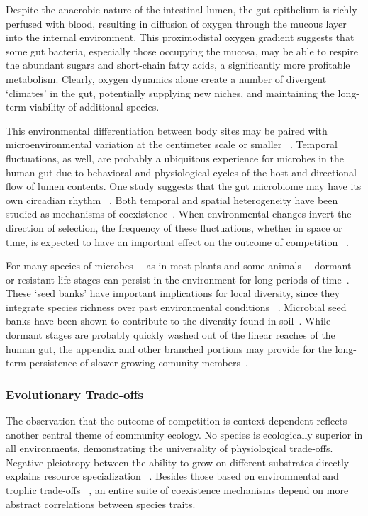 \documentclass[12pt]{article}
\begin{document}
Despite the anaerobic nature of the intestinal lumen,
the gut epithelium is richly perfused with blood, resulting
in diffusion of oxygen through the mucous layer into
the internal environment.
This proximodistal oxygen gradient suggests that some
gut bacteria, especially those occupying the mucosa,
may be able to respire the abundant sugars and short-chain fatty acids,
a significantly more profitable metabolism.
Clearly, oxygen dynamics alone create a number of
divergent `climates' in the gut,
potentially supplying new niches,
and maintaining the long-term viability of additional
species.

This environmental differentiation between body sites may be
paired with microenvironmental variation at the centimeter scale or smaller%
~\citep{Zhang2014}.
Temporal fluctuations, as well, are probably a ubiquitous
experience for microbes in the human gut due to behavioral and physiological
cycles of the host and directional flow of lumen contents.
One study suggests that the gut microbiome may have its own circadian rhythm%
~\citep{Thaiss2014}.
Both temporal and spatial heterogeneity have been studied as
mechanisms of coexistence~\citep{Chesson2000}.
When environmental changes invert the direction of selection,
the frequency of these fluctuations, whether in space or time,
is expected to have an important effect on the outcome of competition%
~\citep{Hutchinson1961}.

For many species of microbes%
---as in most plants and some animals---%
dormant or resistant life-stages can persist in the environment for long
periods of time~\citep{Lennon2011}.
These `seed banks' have important implications for local diversity,
since they integrate species richness over past environmental conditions%
~\citep{Jones2010}.
Microbial seed banks have been shown to contribute to the diversity found in
soil~\citep{Lennon2011}.
While dormant stages are probably quickly washed out of the linear
reaches of the human gut,
the appendix and other branched portions may provide for the long-term
persistence of slower growing comunity members~\citep{Bollinger2007}.

\subsubsection{Evolutionary Trade-offs}
The observation that the outcome of competition is context
dependent reflects another central theme of community ecology.
No species is ecologically superior in all environments,
demonstrating the universality of physiological trade-offs.
Negative pleiotropy between the ability to grow on
different substrates directly explains resource specialization%
~\citep{Futuyma1988}.
Besides those based on environmental and trophic trade-offs%
~\citep{Litchman2007},
an entire suite of coexistence mechanisms
depend on more abstract correlations between species traits.
\end{document}
